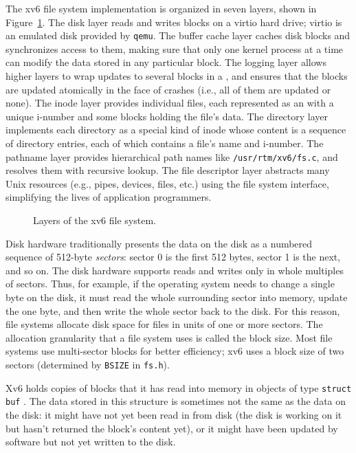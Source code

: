 The xv6 file system implementation is
organized in seven layers, shown in 
Figure~\ref{fig:fslayer}.
The disk layer reads and writes blocks on a virtio hard drive;
virtio is an emulated disk provided by {\tt qemu}.
The buffer cache layer caches disk blocks and synchronizes access to them,
making sure that only one kernel process at a time can modify the
data stored in any particular block.  The logging layer allows higher
layers to wrap updates to several blocks in a
,
and ensures that the blocks are updated atomically in the
face of crashes (i.e., all of them are updated or none).
The inode layer provides individual files, each represented as an
with a unique i-number
and some blocks holding the file's data.  The directory
layer implements each directory as a special kind of
inode whose content is a sequence of directory entries, each of which contains a
file's name and i-number.
The pathname layer provides
hierarchical path names like
\lstinline{/usr/rtm/xv6/fs.c},
and resolves them with recursive lookup.
The file descriptor layer abstracts many Unix resources (e.g., pipes, devices,
files, etc.) using the file system interface, simplifying the lives of
application programmers.

\begin{figure}[t]
\center

\caption{Layers of the xv6 file system.}
\label{fig:fslayer}
\end{figure}

Disk hardware traditionally presents the data on the
disk as a numbered sequence of 512-byte 
\textit{sectors}:
sector 0 is the first 512 bytes, sector 1 is the next, and so on.
The disk hardware supports reads and writes only in whole multiples
of sectors. Thus, for example, if the operating system needs to change
a single byte on the disk, it must read the whole surrounding sector
into memory, update the one byte, and then write the whole sector
back to the disk. For this reason, file systems allocate disk space
for files in units of one or more sectors. The allocation granularity
that a file system uses is called the block  size.
Most file systems use multi-sector
blocks for better efficiency;
xv6 uses a block size of two sectors (determined by
{\tt BSIZE} in {\tt fs.h}).

Xv6 holds copies of blocks that it has read into memory
in objects of type
\lstinline{struct buf}
.
The
data stored in this structure is sometimes 
not the same as the data on the disk: it might have
not yet been read in from disk (the disk is working on it but hasn't returned
the block's content yet), or it might have been updated by software
but not yet written to the disk.

